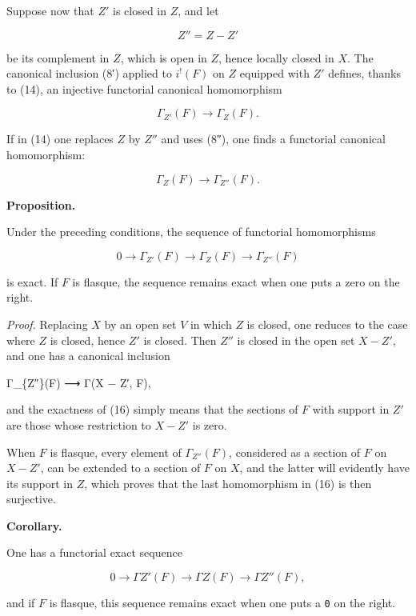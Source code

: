 \documentclass[
  11pt,
  a4paper,
]{book}
\newenvironment{Shaded}{}{}
\newcommand{\NormalTok}[1]{#1}
\begin{document}
Suppose now that \(Z'\) is closed in \(Z\), and let

\[ Z'' = Z - Z' \]

be its complement in \(Z\), which is open in \(Z\), hence locally closed
in \(X\). The canonical inclusion (8′) applied to \(i^{!}(F)\) on \(Z\)
equipped with \(Z'\) defines, thanks to (14), an injective functorial
canonical homomorphism

\[ \Gamma_{Z'}(F) \longrightarrow \Gamma_{Z}(F). \]

If in (14) one replaces \(Z\) by \(Z''\) and uses (8″), one finds a
functorial canonical homomorphism:

\[ \Gamma_{Z}(F) \longrightarrow \Gamma_{Z''}(F). \]

\textbf{Proposition.}

Under the preceding conditions, the sequence of functorial homomorphisms

\[ 0 \longrightarrow \Gamma_{Z'}(F) \longrightarrow \Gamma_{Z}(F) \longrightarrow \Gamma_{Z''}(F) \]

is exact. If \(F\) is flasque, the sequence remains exact when one puts
a zero on the right.

\emph{Proof.} Replacing \(X\) by an open set \(V\) in which \(Z\) is
closed, one reduces to the case where \(Z\) is closed, hence \(Z'\) is
closed. Then \(Z''\) is closed in the open set \(X - Z'\), and one has a
canonical inclusion

\begin{Shaded}
\begin{Highlighting}[]
\NormalTok{Γ\_\{Z″\}(F) ⟶ Γ(X − Z′, F),}
\end{Highlighting}
\end{Shaded}

and the exactness of (16) simply means that the sections of \(F\) with
support in \(Z'\) are those whose restriction to \(X -
Z'\) is zero.

When \(F\) is flasque, every element of \(\Gamma_{Z''}(F)\), considered
as a section of \(F\) on \(X - Z'\), can be extended to a section of
\(F\) on \(X\), and the latter will evidently have its support in \(Z\),
which proves that the last homomorphism in (16) is then surjective.

\textbf{Corollary.}

One has a functorial exact sequence

\[ 0 \longrightarrow \Gamma Z'(F) \longrightarrow \Gamma Z(F) \longrightarrow \Gamma Z''(F), \]

and if \(F\) is flasque, this sequence remains exact when one puts a
\texttt{0} on the right.
\end{document}
